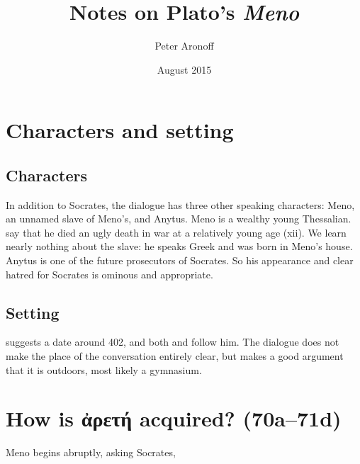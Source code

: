\documentclass[12pt,letterpaper]{article}
\begin{document}
\begin{titlepage}
\title{Notes on Plato's \textit{Meno}}
\author{Peter Aronoff}
\date{August 2015}
\maketitle
\thispagestyle{empty}
\end{titlepage}

\section{Characters and setting}

\subsection{Characters}

In addition to Socrates, the dialogue has three other speaking characters: Meno, an unnamed slave of Meno's, and Anytus. Meno is a wealthy young Thessalian. \textcite{sedleylong2010} say that he died an ugly death in war at a relatively young age (xii). We learn nearly nothing about the slave: he speaks Greek and was born in Meno's house. Anytus is one of the future prosecutors of Socrates. So his appearance and clear hatred for Socrates is ominous and appropriate.


\subsection{Setting}

\textcite[76]{morrison1942} suggests a date around 402, and both \textcite[120]{bluck1961} and \textcite[xii]{sedleylong2010} follow him. The dialogue does not make the place of the conversation entirely clear, but \textcite[120]{bluck1961} makes a good argument that it is outdoors, most likely a gymnasium.



\section{How is \textgreek{ἀρετή} acquired? (70a--71d)}

Meno begins abruptly, asking Socrates,
\end{document}
